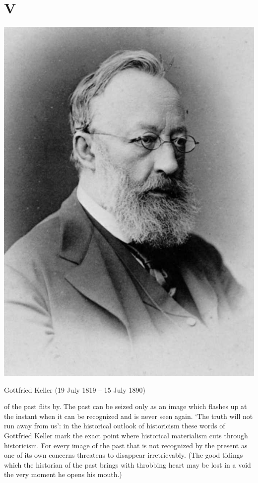 \documentclass[12pt]{tufte-handout}
\begin{document}
\section{V}
\begin{marginfigure}%
  \includegraphics[width=\linewidth]{graphics/Johannes_Ganz_Gottfried_Keller_1885.jpg}
  \caption{Gottfried Keller (19 July 1819 – 15 July 1890)}
  \label{fig:Keller}
\end{marginfigure}
 of the past flits by. The past can be seized only as an image which flashes up at the instant when it can be recognized and is never seen again. `The truth will not run away from us': in the historical outlook of historicism these words of Gottfried Keller mark the exact point where historical materialism cuts through historicism. 
For every image of the past that is not recognized by the present as one of its own concerns threatens to disappear irretrievably. (The good tidings which the historian of the past brings with throbbing heart may be lost in a void the very moment he opens his mouth.)	 
\end{document}
